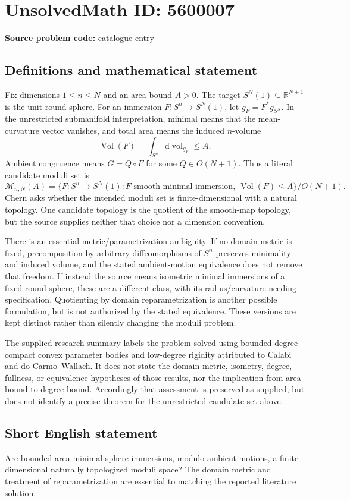 \documentclass[11pt]{article}
\newcommand{\R}{\mathbb{R}}
\begin{document}
\section*{UnsolvedMath ID: 5600007}
\textbf{Source problem code:} catalogue entry
\subsection{Definitions and mathematical statement}
Fix dimensions \(1\le n\le N\) and an area bound \(A>0\). The target \(S^N(1)\subseteq\R^{N+1}\) is the unit round sphere. For an immersion \(F:S^n\to S^N(1)\), let \(g_F=F^*g_{S^N}\). In the unrestricted submanifold interpretation, minimal means that the mean-curvature vector vanishes, and total area means the induced \(n\)-volume
\[
\operatorname{Vol}(F)=\int_{S^n}\mathrm d\operatorname{vol}_{g_F}\le A.
\]
Ambient congruence means \(G=Q\circ F\) for some \(Q\in O(N+1)\). Thus a literal candidate moduli set is
\[
\mathcal M_{n,N}(A)=
\{F:S^n\to S^N(1):F\text{ smooth minimal immersion},\ \operatorname{Vol}(F)\le A\}/O(N+1).
\]
Chern asks whether the intended moduli set is finite-dimensional with a natural topology. One candidate topology is the quotient of the smooth-map topology, but the source supplies neither that choice nor a dimension convention.

There is an essential metric/parametrization ambiguity. If no domain metric is fixed, precomposition by arbitrary diffeomorphisms of \(S^n\) preserves minimality and induced volume, and the stated ambient-motion equivalence does not remove that freedom. If instead the source means isometric minimal immersions of a fixed round sphere, these are a different class, with its radius/curvature needing specification. Quotienting by domain reparametrization is another possible formulation, but is not authorized by the stated equivalence. These versions are kept distinct rather than silently changing the moduli problem.

The supplied research summary labels the problem solved using bounded-degree compact convex parameter bodies and low-degree rigidity attributed to Calabi and do Carmo--Wallach. It does not state the domain-metric, isometry, degree, fullness, or equivalence hypotheses of those results, nor the implication from area bound to degree bound. Accordingly that assessment is preserved as supplied, but does not identify a precise theorem for the unrestricted candidate set above.
\subsection{Short English statement}
Are bounded-area minimal sphere immersions, modulo ambient motions, a finite-dimensional naturally topologized moduli space? The domain metric and treatment of reparametrization are essential to matching the reported literature solution.
\end{document}
